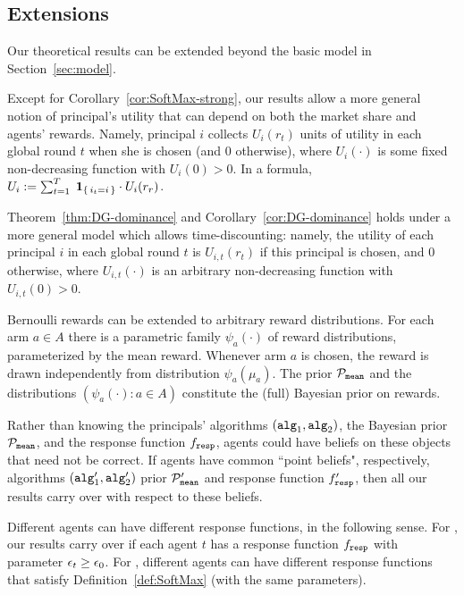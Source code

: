 \subsection{Extensions}
\label{sec:theory-extensions}

Our theoretical results can be extended beyond the basic model in Section~\ref{sec:model}.


Except for Corollary~\ref{cor:SoftMax-strong}, our results allow a more general notion of principal's utility that can depend on both the market share and agents' rewards. Namely, principal $i$ collects $U_i(r_t)$ units of utility in each global round $t$ when she is chosen (and $0$ otherwise), where $U_i(\cdot)$ is some fixed non-decreasing function with $U_i(0)>0$. In a formula,
$U_i := \sum_{t=1}^T\; \indicator{i_t=i}\cdot U_i(r_r)$.

Theorem~\ref{thm:DG-dominance} and Corollary~\ref{cor:DG-dominance} holds under a more general model which allows time-discounting: namely, the utility of each principal $i$ in each global round $t$ is $U_{i,t}(r_t)$ if this principal is chosen, and $0$ otherwise, where $U_{i,t}(\cdot)$ is an arbitrary non-decreasing function with $U_{i,t}(0)>0$.

Bernoulli rewards can be extended to arbitrary reward distributions. For each arm $a\in A$ there is a parametric family $\psi_a(\cdot)$ of reward distributions, parameterized by the mean reward. Whenever arm $a$ is chosen, the reward is drawn independently from distribution $\psi_a(\mu_a)$. The prior $\priorMu$ and the distributions $(\psi_a(\cdot)\colon a\in A)$ constitute the (full) Bayesian prior on rewards.%

 Rather than knowing the principals' algorithms $(\alg[1],\alg[2])$, the Bayesian prior $\priorMu$, and the response function $\respF$, agents could have beliefs on these objects that need not be correct. If agents have common ``point beliefs", respectively, algorithms $(\alg[1]',\alg[2]')$ prior $\priorMu'$ and response function $\respF'$,  then all our results carry over with respect to these beliefs.

Different agents can have different response functions, in the following sense. For \HardMaxRandom, our results carry over if each agent $t$ has a \HardMaxRandom response function $\respF$ with parameter $\eps_t\geq \eps_0$. For \SoftMaxRandom, different agents can have different response functions that satisfy Definition~\ref{def:SoftMax} (with the same parameters).

